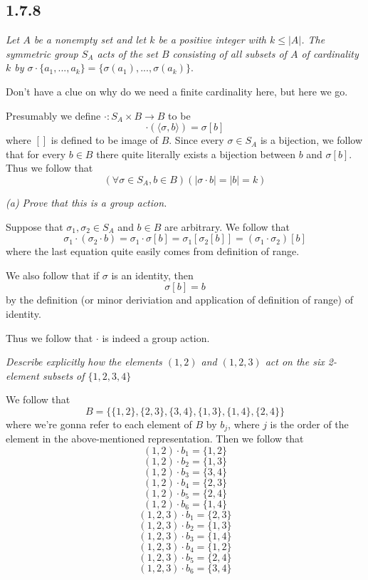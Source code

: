 \documentclass[11pt,oneside,titlepage]{book}
\newcommand{\eangle}[1]{\langle #1 \rangle}
\begin{document}
\subsection{1.7.8}

\textit{Let $A$ be a nonempty set and let $k$ be a positive integer with $k \leq |A|$. The
  symmetric group $S_A$ acts of the set $B$ consisting of all subsets of $A$ of
  cardinality $k$ by $\sigma \cdot \{a_1, ..., a_k\} =   \{\sigma(a_1), ..., \sigma(a_k)\}$}.

Don't have a clue on why do we need a finite cardinality here, but here we go.

Presumably we define $\cdot: S_A \times B \to B$ to be
$$\cdot(\eangle{\sigma, b}) = \sigma[b]$$
where $[]$ is defined to be image of $B$.
Since every $\sigma \in S_A$ is a bijection, we follow that for every $b \in B$
there quite literally exists a bijection between $b$ and $\sigma[b]$. Thus we follow that
$$(\forall \sigma \in S_A, b \in B)(|\sigma \cdot b| = |b| = k)$$


\textit{(a) Prove that this is a group action.}

Suppose that $\sigma_1, \sigma_2 \in S_A$ and  $b \in B$ are arbitrary. We follow that
$$\sigma_1 \cdot (\sigma_2 \cdot b) = \sigma_1 \cdot \sigma[b] = \sigma_1 [\sigma_2[b]] =
(\sigma_1 \cdot \sigma_2)[b]$$
where the last equation quite easily comes from definition of range.

We also follow that if $\sigma$ is an identity, then
$$\sigma[b] = b$$
by the definition (or minor deriviation and application of definition of range) of identity.

Thus we follow that $\cdot$ is indeed a group action.

\textit{Describe explicitly how the elements $(1, 2)$ and $(1, 2, 3)$ act on the six 2-element
  subsets of $\{1, 2, 3, 4\}$}

We follow that
$$B = \{\{1, 2\}, \{2, 3\}, \{3, 4\}, \{1, 3\}, \{1, 4\}, \{2, 4\}\}$$
where we're gonna refer to each element of $B$ by $b_j$, where $j$ is the order of
the element in the above-mentioned representation. Then we follow that
$$(1, 2) \cdot b_1 = \{1, 2\}$$
$$(1, 2) \cdot b_2 = \{1, 3\}$$
$$(1, 2) \cdot b_3 = \{3, 4\}$$
$$(1, 2) \cdot b_4 = \{2, 3\}$$
$$(1, 2) \cdot b_5 = \{2, 4\}$$
$$(1, 2) \cdot b_6 = \{1, 4\}$$
$$(1, 2, 3) \cdot b_1 = \{2, 3\}$$
$$(1, 2, 3) \cdot b_2 = \{1, 3\}$$
$$(1, 2, 3) \cdot b_3 = \{1, 4\}$$
$$(1, 2, 3) \cdot b_4 = \{1, 2\}$$
$$(1, 2, 3) \cdot b_5 = \{2, 4\}$$
$$(1, 2, 3) \cdot b_6 = \{3, 4\}$$
\end{document}
